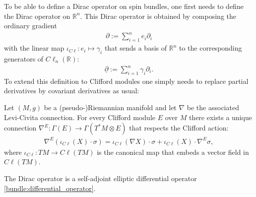 
    To be able to define a Dirac operator on spin bundles, one first needs to define the Dirac operator on $\mathbb{R}^n$. This Dirac operator is obtained by composing the ordinary gradient
    \begin{gather}
        \partial:=\sum_{i=1}^ne_i\partial_i
    \end{gather}
    with the linear map $\iota_{C\ell}:e_i\mapsto\gamma_i$ that sends a basis of $\mathbb{R}^n$ to the corresponding generators of $C\ell_n(\mathbb{R})$:
    \begin{gather}
        \label{riemann:dirac_operator_R}
        \underline{\partial} := \sum_{i=1}^n\gamma_i\partial_i.
    \end{gather}
    To extend this definition to Clifford modules one simply needs to replace partial derivatives by covariant derivatives as usual:
    \begin{property}
        Let $(M,g)$ be a (pseudo-)Riemannian manifold and let $\nabla$ be the associated Levi-Civita connection. For every Clifford module $E$ over $M$ there exists a unique connection $\nabla^E:\Gamma(E)\rightarrow \Gamma(T^*M\otimes E)$ that respects the Clifford action:
        \begin{gather}
            \nabla^E(\iota_{C\ell}(X)\cdot\sigma) = \iota_{C\ell}(\nabla X)\cdot\sigma + \iota_{C\ell}(X)\cdot\nabla^E\sigma,
        \end{gather}
        where $\iota_{C\ell}:TM\rightarrow C\ell(TM)$ is the canonical map that embeds a vector field in $C\ell(TM)$.
    \end{property}

    \begin{property}[Ellipticity]
        The Dirac operator is a self-adjoint elliptic differential operator \ref{bundle:differential_operator}.
    \end{property}

